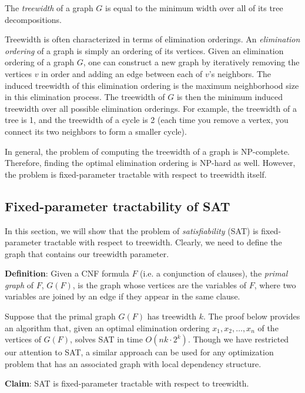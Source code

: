 \documentclass{article}
\begin{document}
The \emph{treewidth} of a graph $G$ is equal to the minimum width over
all of its tree decompositions.

Treewidth is often characterized in terms of elimination
orderings. An \emph{elimination ordering} of a graph is simply
an ordering of its vertices. Given an elimination ordering of a
graph $G$, one can construct a new graph by iteratively removing
the vertices $v$ in order and adding an edge between each of $v$'s
neighbors. The induced treewidth of this elimination ordering is
the maximum neighborhood size in this elimination process. The
treewidth of $G$ is then the minimum induced treewidth over all
possible elimination orderings. For example, the treewidth of a
tree is 1, and the treewidth of a cycle is 2 (each time you remove
a vertex, you connect its two neighbors to form a smaller cycle).

In general, the problem of computing the treewidth of a graph is
NP-complete. Therefore, finding the optimal elimination ordering is NP-hard as well.
However, the problem is fixed-parameter tractable
with respect to treewidth itself.

\subsection{Fixed-parameter tractability of SAT}

In this section, we will show that the problem of
\emph{satisfiability} (SAT) is fixed-parameter tractable with
respect to treewidth. Clearly, we need to define the graph that
contains our treewidth parameter.

\textbf{Definition}:
Given a CNF formula $F$ (i.e. a conjunction of clauses), the
\emph{primal graph} of $F$, $G(F)$, is the graph whose vertices
are the variables of $F$, where two variables are joined by an
edge if they appear in the same clause.

Suppose that the primal graph $G(F)$ has treewidth $k$. The proof
below provides an algorithm that, given an optimal elimination
ordering $x_1,x_2,\ldots,x_n$ of the vertices of $G(F)$, solves
SAT in time $O(nk\cdot 2^k)$. Though we have restricted our
attention to SAT, a similar approach can be used for any
optimization problem that has an associated graph with local
dependency structure.

\textbf{Claim}:
SAT is fixed-parameter tractable with respect to treewidth.
\end{document}
